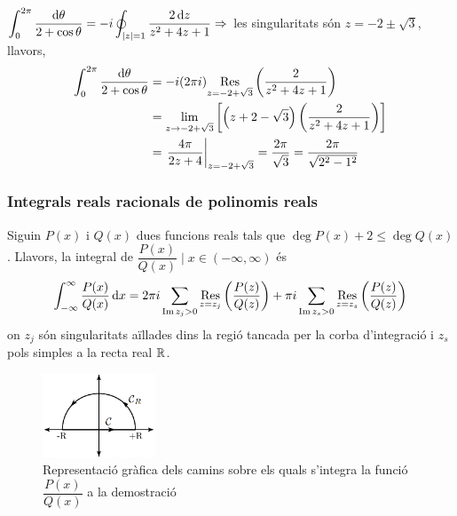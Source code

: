 \begin{example}
    $\displaystyle \int_{0}^{2\pi} \frac{\mathrm{d} \theta}{2 + \cos \theta} = -i \oint_{\left| z \right|=1} \frac{2 \mathop{}\!\mathrm{d} z}{z^{2} + 4z + 1} \Rightarrow$ les singularitats són $z = -2 \pm \sqrt{3}$, llavors,
    \begin{align*}
    \begin{aligned}
        \int_{0}^{2\pi} \frac{\mathrm{d} \theta}{2 + \cos \theta} &= -i (2\pi i) \underset{z=-2+\sqrt{3}}{\operatorname{Res}} \left( \frac{2}{z^{2} + 4z + 1} \right) \\
        &= \lim_{z\to -2 + \sqrt{3}} \left[ \left( z + 2 - \sqrt{3} \right) \left( \frac{2}{z^{2} + 4z + 1} \right) \right] \\
        &= \left. \frac{4\pi}{2z + 4} \right|_{z = -2 + \sqrt{3}} = \frac{2\pi}{\sqrt{3}} = \frac{2\pi}{\sqrt{2^{2} - 1^{2}}}
    \end{aligned}
    \end{align*}
\end{example}
\subsubsection*{Integrals reals racionals de polinomis reals}
Siguin $P(x)$ i $Q(x)$ dues funcions reals tals que $\deg{P(x)} + 2 \leq \deg{Q(x)}$. Llavors, la integral de $\dfrac{P(x)}{Q(x)} \mid x \in (-\infty, \infty)$ és
\begin{align}
    \int_{-\infty}^{\infty} \frac{P(x)}{Q(x)} \mathop{}\!\mathrm{d} x = 2\pi i \sum_{\operatorname{Im}z_{j} > 0} \underset{z=z_{j}}{\operatorname{Res}} \left( \frac{P(z)}{Q(z)} \right) + \pi i \sum_{\operatorname{Im}z_{s} > 0} \underset{z=z_{s}}{\operatorname{Res}} \left( \frac{P(z)}{Q(z)} \right)
\end{align}
on $z_{j}$ són singularitats aïllades dins la regió tancada per la corba d'integració i $z_{s}$ pols simples a la recta real $\mathbb{R}$.

\begin{figure}[H]
    \centering
    \includegraphics[width=0.3\textwidth]{./images/graph51}
    \caption{Representació gràfica dels camins sobre els quals s'integra la funció $\dfrac{P(x)}{Q(x)}$ a la demostració}
    \label{fig:graph51}
\end{figure}

